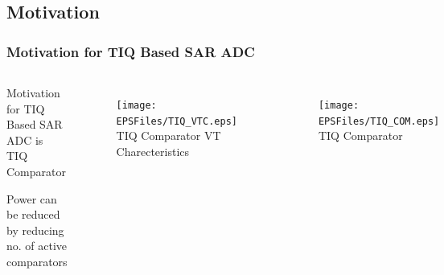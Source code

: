 \subsection*{Motivation}
\begin{frame}
	\frametitle{Motivation for TIQ Based SAR ADC}
	\begin{center}
		\begin{columns}[c]
		\column{3.25in}
			\begin{itemize}
				\small{\item{Motivation for TIQ Based SAR ADC is TIQ Comparator}
       				\item{Power can be reduced by reducing no. of active comparators}}
 			\end{itemize}
			\begin{figure}
				\begin{center}
				\texttt{[image: EPSFiles/TIQ\_VTC.eps]}\\
				\small{TIQ Comparator VT Charecteristics}
                		\end{center}
			\end{figure}			
		\column{1.75in}
			\begin{figure}
				\begin{center}
				\texttt{[image: EPSFiles/TIQ\_COM.eps]}\\
               			\small{TIQ Comparator}
				\end{center}
			\end{figure}
		\end{columns}
	\end{center}	
\end{frame}
